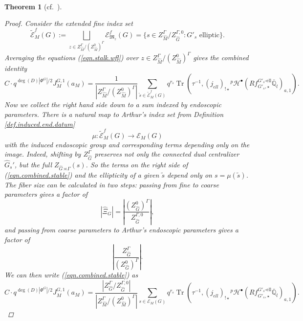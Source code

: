 \documentclass[openany]{amsbook}
\newtheorem{theorem}{Theorem}[chapter]
\theoremstyle{definition}
\theoremstyle{remark}
\numberwithin{equation}{section}
\newcommand{\Q}{\mathbb{Q}}
\newcommand{\cE}{\mathcal{E}}
\newcommand{\ol}[1]{\overline{#1}}
\newcommand{\Tr}{\operatorname{Tr }}
\renewcommand{\-}{\operatorname{-}}
\newcommand{\pH}{{}^p \mathcal{H}}
\newcommand{\wtilde}[1]{\widetilde{#1}}
\newcommand{\el}{\text{-ell}}
\newcommand{\fM}{\mathfrak{M}}
\begin{document}
\begin{theorem}[{cf.\ \cite[Th\'eor\`eme 14.1.1]{CLII}}]
\begin{proof}
    Consider the extended fine index set
    $$
        \wtilde{\cE}_M^f(G) := \bigsqcup_{z \in Z_{\widehat{M}}^\Gamma/(Z_{\widehat{M}}^0)^\Gamma} \cE_{\fM_z}^f(G) = \{s \in Z^\Gamma_{\widehat{M}}/Z_{\widehat{G}}^{\Gamma,0} : G'_s \text{ elliptic}\}.
    $$
    Averaging the equations (\ref{eqn.stalk.wfl}) over $z \in Z_{\widehat{M}}^\Gamma/(Z_{\widehat{M}}^0)^\Gamma$ gives the combined identity
    \begin{equation}
        C \cdot q^{\deg(D) |\Phi^G|/2} J^{G,1}_M(a_M) = \frac{1}{|Z_{\widehat{M}}^\Gamma/(Z_{\widehat{M}}^0)^\Gamma|} \sum_{\wtilde{s} \in \wtilde{\cE}_{M}^f(G)} q^{r_s} \Tr(\tau^{-1}, (j_{ell})_{!\star} \pH^\bullet(Rf_{G'_s,\star}^{G'_s\el} \ol{\Q}_l)_{a, 1}).\label{eqn.combined.stable}
    \end{equation}
    Now we collect the right hand side down to a sum indexed by endoscopic parameters. There is a natural map to Arthur's index set from Definition \ref{def.induced.end.datum}
    $$
        \mu : \wtilde{\cE}_M^f(G) \to \cE_M(G)
    $$
    with the induced endoscopic group and corresponding terms depending only on the image. Indeed, shifting by $Z_{\widehat{G}}^\Gamma$ preserves not only the connected dual centralizer $\widehat{G}_{s}'$, but the full $Z_{\widehat{G} \rtimes \Gamma}(s)$. 
    So the terms on the right side of (\ref{eqn.combined.stable}) and the ellipticity of a given $\wtilde{s}$ depend only on $s = \mu(\wtilde{s})$. The fiber size can be calculated in two steps: passing from fine to coarse parameters gives a factor of 
    $$
        |\widehat{\Xi}_G| = \left|\frac{(Z_{\widehat{G}}^0)^\Gamma}{Z_{\widehat{G}}^{\Gamma,0}}\right|,
    $$
    and passing from coarse parameters to Arthur's endoscopic parameters gives a factor of
    $$
        \left|\frac{Z_{\widehat{G}}^\Gamma}{(Z_{\widehat{G}}^0)^\Gamma}\right|.
    $$
    We can then write (\ref{eqn.combined.stable}) as
    $$
        C \cdot q^{\deg(D) |\Phi^G|/2} J^{G,1}_M(a_M) = \frac{|Z_{\widehat{G}}^\Gamma/Z^{\Gamma,0}_{\widehat{G}}|}{|Z_{\widehat{M}}^\Gamma/(Z_{\widehat{M}}^0)^\Gamma|} \sum_{s \in {\cE}_{M}(G)} q^{r_s} \Tr(\tau^{-1}, (j_{ell})_{!\star} \pH^\bullet(Rf_{G'_s,\star}^{G'_s\el} \ol{\Q}_l)_{a, 1}).
    $$


\end{proof}
\end{theorem}
\end{document}
